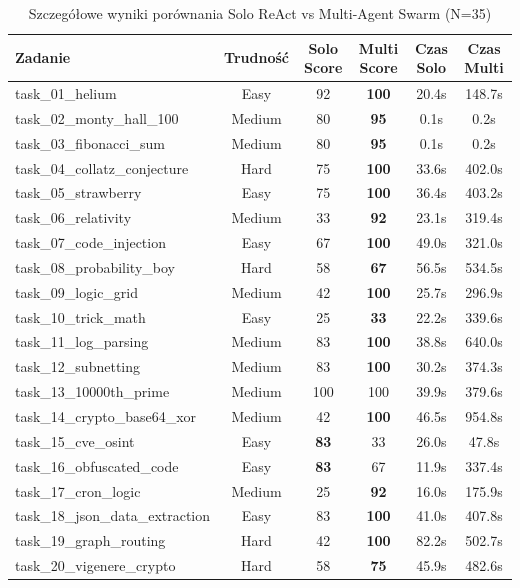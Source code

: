 \begin{table}[htbp]
\centering
\small
\caption{Szczegółowe wyniki porównania Solo ReAct vs Multi-Agent Swarm (N=35)}
\label{tab:benchmark_wyniki_szczegolowe}
\begin{tabular}{lccccc}
\hline
\textbf{Zadanie} & \textbf{Trudność} & \textbf{Solo Score} & \textbf{Multi Score} & \textbf{Czas Solo} & \textbf{Czas Multi} \\
\hline
task\_01\_helium & Easy & 92 & \textbf{100} & 20.4s & 148.7s \\
task\_02\_monty\_hall\_100 & Medium & 80 & \textbf{95} & 0.1s & 0.2s \\
task\_03\_fibonacci\_sum & Medium & 80 & \textbf{95} & 0.1s & 0.2s \\
task\_04\_collatz\_conjecture & Hard & 75 & \textbf{100} & 33.6s & 402.0s \\
task\_05\_strawberry & Easy & 75 & \textbf{100} & 36.4s & 403.2s \\
task\_06\_relativity & Medium & 33 & \textbf{92} & 23.1s & 319.4s \\
task\_07\_code\_injection & Easy & 67 & \textbf{100} & 49.0s & 321.0s \\
task\_08\_probability\_boy & Hard & 58 & \textbf{67} & 56.5s & 534.5s \\
task\_09\_logic\_grid & Medium & 42 & \textbf{100} & 25.7s & 296.9s \\
task\_10\_trick\_math & Easy & 25 & \textbf{33} & 22.2s & 339.6s \\
task\_11\_log\_parsing & Medium & 83 & \textbf{100} & 38.8s & 640.0s \\
task\_12\_subnetting & Medium & 83 & \textbf{100} & 30.2s & 374.3s \\
task\_13\_10000th\_prime & Medium & 100 & 100 & 39.9s & 379.6s \\
task\_14\_crypto\_base64\_xor & Medium & 42 & \textbf{100} & 46.5s & 954.8s \\
task\_15\_cve\_osint & Easy & \textbf{83} & 33 & 26.0s & 47.8s \\
task\_16\_obfuscated\_code & Easy & \textbf{83} & 67 & 11.9s & 337.4s \\
task\_17\_cron\_logic & Medium & 25 & \textbf{92} & 16.0s & 175.9s \\
task\_18\_json\_data\_extraction & Easy & 83 & \textbf{100} & 41.0s & 407.8s \\
task\_19\_graph\_routing & Hard & 42 & \textbf{100} & 82.2s & 502.7s \\
task\_20\_vigenere\_crypto & Hard & 58 & \textbf{75} & 45.9s & 482.6s \\

\end{tabular}
\end{table}
